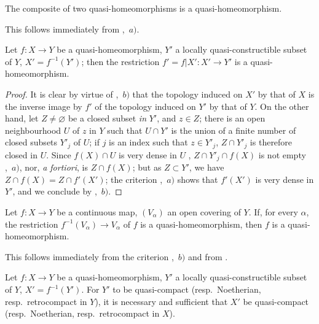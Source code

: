 \begin{corollary}[10.2.3]
\label{IV.10.2.3}
The composite of two quasi-homeomorphisms is a quasi-homeomorphism.
\end{corollary}

This follows immediately from ,~$a)$.

\begin{corollary}[10.2.4]
\label{IV.10.2.4}
Let $f:X\to Y$ be a quasi-homeomorphism, $Y'$ a locally quasi-constructible subset of $Y$, $X'=f^{-1}(Y')$; then the restriction $f'=f|X':X'\to Y'$ is a quasi-homeomorphism.
\end{corollary}

\begin{proof}
It is clear by virtue of ,~$b)$ that the topology induced on $X'$ by that of $X$ is the inverse image by $f'$ of the topology induced on $Y'$ by that of $Y$.
On the other hand,
let $Z\neq\varnothing$ be a closed subset \emph{in} $Y'$, and $z\in Z$; there is an open neighbourhood $U$ of $z$ in $Y$ such that $U\cap Y'$ is the union of a finite number of closed subsets $Y'_j$ of $U$; if $j$ is an index such that $z\in Y'_j$, $Z\cap Y'_j$ is therefore closed in $U$.
Since $f(X)\cap U$ is very dense in $U$ , $Z\cap Y'_j\cap f(X)$ is not empty ,~$a)$, nor, \emph{a fortiori}, is $Z\cap f(X)$; but as $Z\subset Y'$, we have $Z\cap f(X)=Z\cap f'(X')$; the criterion ,~$a)$ shows that $f'(X')$ is very dense in $Y'$, and we conclude by ,~$b)$.
\end{proof}

\begin{corollary}[10.2.5]
\label{IV.10.2.5}
Let $f:X\to Y$ be a continuous map, $(V_\alpha)$ an open covering of $Y$.
If, for every $\alpha$, the restriction $f^{-1}(V_\alpha)\to V_\alpha$ of $f$ is a quasi-homeomorphism, then $f$ is a quasi-homeomorphism.
\end{corollary}

This follows immediately from the criterion ,~$b)$ and from .

\begin{corollary}[10.2.6]
\label{IV.10.2.6}
Let $f:X\to Y$ be a quasi-homeomorphism, $Y'$ a locally quasi-constructible subset of $Y$, $X'=f^{-1}(Y')$.
For $Y'$ to be quasi-compact (resp.\ Noetherian, resp.\ retrocompact in $Y$), it is necessary and sufficient that $X'$ be quasi-compact (resp.\ Noetherian, resp.\ retrocompact in $X$).
\end{corollary}

